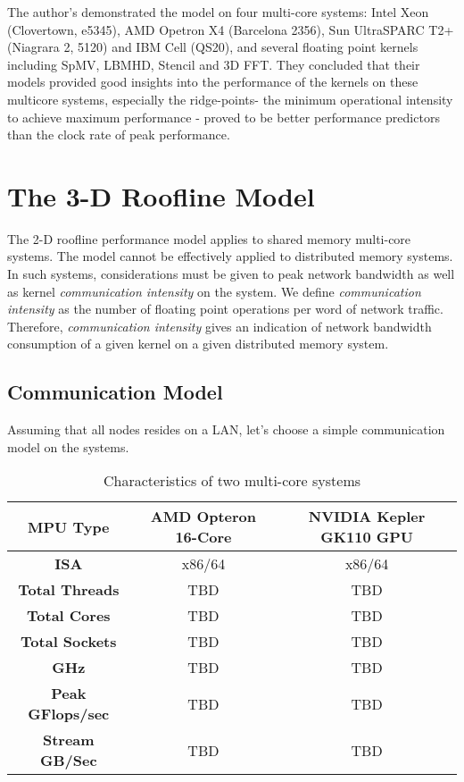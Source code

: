 \documentclass[dvips,12pt]{article}
\begin{document}
The author's demonstrated the model on four multi-core systems: Intel Xeon (Clovertown, e5345), AMD Opetron X4 (Barcelona 2356), Sun UltraSPARC T2+ (Niagrara 2, 5120) and IBM Cell (QS20), and several floating point kernels including SpMV, LBMHD, Stencil and 3D FFT. They concluded that their models provided good insights into the performance of the kernels on these multicore systems, especially the ridge-points- the minimum operational intensity to achieve maximum performance - proved to be better performance predictors than the clock rate of peak performance.

\section{The 3-D Roofline Model}
The 2-D roofline performance model applies to shared memory multi-core systems. The model cannot be effectively applied to distributed memory systems. In such systems, considerations must be given to peak network bandwidth as well as kernel \textit{communication intensity} on the system. We define \textit{communication intensity} as the number of floating point operations per word of network traffic. Therefore, \textit{communication intensity} gives an indication of network bandwidth consumption of a given kernel on a given distributed memory system.  

\subsection{Communication Model}
Assuming that all nodes resides on a LAN, let's choose a simple communication model on the systems.


\begin{table}[h]
\centering
\begin{tabular}{|c|c|c|}
\hline
\textbf{MPU Type} &\textbf{AMD Opteron 16-Core} &\textbf{NVIDIA Kepler GK110 GPU}\\
\hline
\textbf{ISA} & x86/64 & x86/64 \\
\hline
\textbf{Total Threads} & TBD & TBD \\
\hline	
\textbf{Total Cores} & TBD &  TBD \\
\hline
\textbf{Total Sockets} &  TBD &  TBD \\
\hline
\textbf{GHz} &  TBD &  TBD \\
\hline
\textbf{Peak GFlops/sec} & TBD &  TBD \\
\hline		
\textbf{Stream GB/Sec} &  TBD &  TBD \\
\hline		
\end{tabular}
\caption{Characteristics of two multi-core systems }
\label{systems}
\end{table} 
\end{document}
